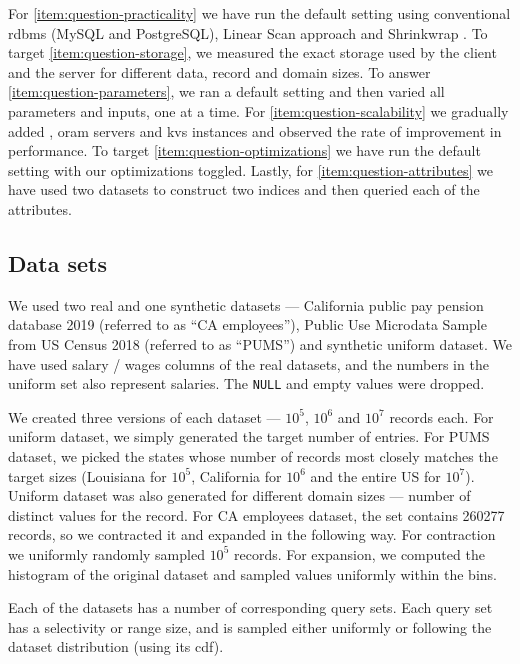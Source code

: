 	For \ref{item:question-practicality} we have run the default setting using conventional \acrshort{rdbms} (MySQL and PostgreSQL), Linear Scan approach and Shrinkwrap \cite{shrinkwrap}. %
	To target \ref{item:question-storage}, we measured the exact storage used by the client and the server for different data, record and domain sizes. %
	To answer \ref{item:question-parameters}, we ran a default setting and then varied all parameters and inputs, one at a time. %
	For \ref{item:question-scalability} we gradually added , \acrshort{oram} servers and \acrshort{kvs} instances and observed the rate of improvement in performance. %
	To target \ref{item:question-optimizations} we have run the default setting with our optimizations toggled. %
	Lastly, for \ref{item:question-attributes} we have used two datasets to construct two indices and then queried each of the attributes. %

	\subsection{Data sets}\label{section:range-persistent:experiments:data-sets}

		We used two real and one synthetic datasets --- California public pay pension database 2019 \cite{ca-employees-dataset} (referred to as ``CA employees''), Public Use Microdata Sample from US Census 2018 \cite{pums-dataset} (referred to as ``PUMS'') and synthetic uniform dataset.
		We have used salary / wages columns of the real datasets, and the numbers in the uniform set also represent salaries.
		The \texttt{NULL} and empty values were dropped.

		We created three versions of each dataset --- $10^5$, $10^6$ and $10^7$ records each.
		For uniform dataset, we simply generated the target number of entries.
		For PUMS dataset, we picked the states whose number of records most closely matches the target sizes (Louisiana for $10^5$, California for $10^6$ and the entire US for $10^7$).
		Uniform dataset was also generated for different domain sizes --- number of distinct values for the record.
		For CA employees dataset, the set contains \num{260 277} records, so we contracted it and expanded in the following way.
		For contraction we uniformly randomly sampled $10^5$ records.
		For expansion, we computed the histogram of the original dataset and sampled values uniformly within the bins.

		Each of the datasets has a number of corresponding query sets.
		Each query set has a selectivity or range size, and is sampled either uniformly or following the dataset distribution (using its \acrshort{cdf}).


